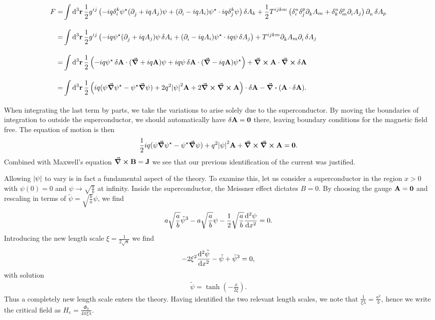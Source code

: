 \begin{align*}
	F =& \inte{}{}\dd[3]{\vb{r}}\frac{1}{2}g^{ij}\left(-iq\kdelta{k}{i}\psi\cc(\del{}{j} + iqA_{j})\psi + (\del{}{i} - iqA_{i})\psi\cc\cdot iq\kdelta{k}{j}\psi\right)\var{A_{k}} + \frac{1}{2}T^{ijkm}\left(\kdelta{n}{i}\kdelta{p}{j}\del{}{k}A_{m} + \kdelta{n}{k}\kdelta{p}{m}\del{}{i}A_{j}\right)\del{}{n}\var{A_{p}} \\
	  =& \inte{}{}\dd[3]{\vb{r}}\frac{1}{2}g^{ij}\left(-iq\psi\cc(\del{}{j} + iqA_{j})\psi\var{A_{i}} + (\del{}{i} - iqA_{i})\psi\cc\cdot iq\psi\var{A_{j}}\right) + T^{ijkm}\del{}{k}A_{m}\del{}{i}\var{A_{j}} \\
	  =& \inte{}{}\dd[3]{\vb{r}}\frac{1}{2}\left(-iq\psi\cc\var{\vb{A}}\cdot(\grad{} + iq\vb{A})\psi + iq\psi\var{\vb{A}}\cdot(\grad{} - iq\vb{A})\psi\cc\right) + \curl{\vb{A}}\cdot\curl{\var{\vb{A}}} \\
	  =& \inte{}{}\dd[3]{\vb{r}}\frac{1}{2}\left(iq(\psi\grad{\psi\cc} - \psi\cc\grad{\psi}) + 2q^{2}\abs{\psi}^{2}\vb{A} + 2\curl{\curl{\vb{A}}}\right)\cdot\var{\vb{A}} - \div(\vb{A}\cdot\var{\vb{A}}).
\end{align*}
When integrating the last term by parts, we take the variations to arise solely due to the superconductor. By moving the boundaries of integration to outside the superconductor, we should automatically have $\var{\vb{A}} = \vb{0}$ there, leaving boundary conditions for the magnetic field free. The equation of motion is then
\begin{align*}
	\frac{1}{2}iq(\psi\grad{\psi\ensuremath{^{\star}}} - \psi^{\star}\grad{\psi}) + q^{2}\abs{\psi}^{2}\vb{A} + \curl{\curl{\vb{A}}} = \vb{0}.
\end{align*}
Combined with Maxwell's equation $\curl{\vb{B}} = \vb{J}$ we see that our previous identification of the current was justified.

Allowing $\abs{\psi}$ to vary is in fact a fundamental aspect of the theory. To examine this, let us consider a superconductor in the region $x > 0$ with $\psi(0) = 0$ and $\psi\to\sqrt{\frac{a}{b}}$ at infinity. Inside the superconductor, the Meissner effect dictates $B = 0$. By choosing the gauge $\vb{A} = \vb{0}$ and rescaling in terms of $\tilde{\psi} = \sqrt{\frac{b}{a}}\psi$, we find
\begin{align*}
	a\sqrt{\frac{a}{b}}\tilde{\psi}^{3} - a\sqrt{\frac{a}{b}}\psi - \frac{1}{2}\sqrt{\frac{a}{b}}\dv[2]{\psi}{x} = 0.
\end{align*}
Introducing the new length scale $\xi = \frac{1}{2\sqrt{a}}$ we find
\begin{align*}
	-2\xi^{2}\dv[2]{\tilde{\psi}}{x} - \tilde{\psi} + \tilde{\psi}^{3} = 0,
\end{align*}
with solution
\begin{align*}
	\tilde{\psi} = \tanh(-\frac{x}{2\xi}).
\end{align*}
Thus a completely new length scale enters the theory. Having identified the two relevant length scales, we note that $\frac{1}{\xi\lambda} = \frac{a^{2}}{b}$, hence we write the critical field as $H_{\text{c}} = \frac{\Phi_{0}}{4\pi\xi\lambda}$.

